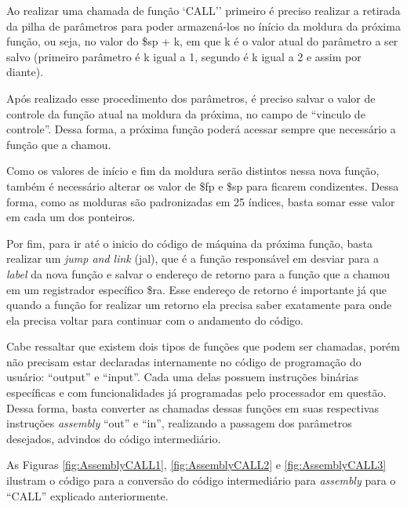 \documentclass[
	12pt,				%
	oneside,
	a4paper,			%
	english,			%
	french,				%
	spanish,			%
	brazil,				%
	]{abntex2}
\begin{document}
Ao realizar uma chamada de função `CALL'' primeiro é preciso realizar a retirada da pilha de parâmetros para poder armazená-los no ínício da moldura da próxima função, ou seja, no valor do \$sp + k, em que k é o valor atual do parâmetro a ser salvo (primeiro parâmetro é k igual a 1, segundo é k igual a 2 e assim por diante). 

Após realizado esse procedimento dos parâmetros, é preciso salvar o valor de controle da função atual na moldura da próxima, no campo de ``vinculo de controle''. Dessa forma, a próxima função poderá acessar sempre que necessário a função que a chamou.

Como os valores de início e fim da moldura serão distintos nessa nova função, também é necessário alterar os valor de \$fp e \$sp para ficarem condizentes. Dessa forma, como as molduras são padronizadas em 25 índices, basta somar esse valor em cada um dos ponteiros. 

Por fim, para ir até o inicio do código de máquina da próxima função, basta realizar um \emph{jump and link} (jal), que é a função responsável em desviar para a \emph{label} da nova função e salvar o endereço de retorno para a função que a chamou em um registrador específico \$ra. Esse endereço de retorno é importante já que quando a função for realizar um retorno ela precisa saber exatamente para onde ela precisa voltar para continuar com o andamento do código.

Cabe ressaltar que existem dois tipos de funções que podem ser chamadas, porém não precisam estar declaradas internamente no código de programação do usuário: ``output'' e ``input''. Cada uma delas possuem instruções binárias específicas e com funcionalidades já programadas pelo processador em questão. Dessa forma, basta converter as chamadas dessas funções em suas respectivas instruções \emph{assembly} ``out'' e ``in'', realizando a passagem dos parâmetros desejados, advindos do código intermediário. 

As Figuras \ref{fig:AssemblyCALL1}, \ref{fig:AssemblyCALL2} e \ref{fig:AssemblyCALL3} ilustram o código para a conversão do código intermediário para \emph{assembly} para o ``CALL'' explicado anteriormente.
\end{document}
